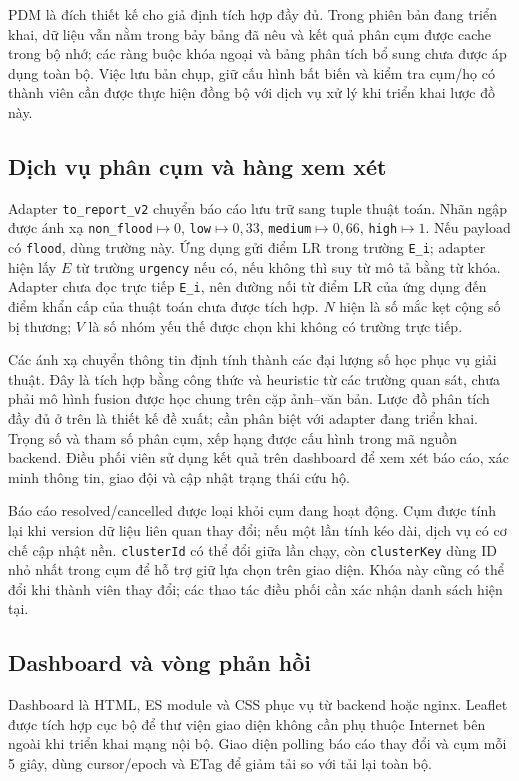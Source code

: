 PDM là đích thiết kế cho giả định tích hợp đầy đủ. Trong phiên bản đang triển khai, dữ liệu vẫn nằm trong bảy bảng đã nêu và kết quả phân cụm được cache trong bộ nhớ; các ràng buộc khóa ngoại và bảng phân tích bổ sung chưa được áp dụng toàn bộ. Việc lưu bản chụp, giữ cấu hình bất biến và kiểm tra cụm/họ có thành viên cần được thực hiện đồng bộ với dịch vụ xử lý khi triển khai lược đồ này.

\subsection{Dịch vụ phân cụm và hàng xem xét}
Adapter \texttt{to\_report\_v2} chuyển báo cáo lưu trữ sang tuple thuật toán. Nhãn ngập được ánh xạ \texttt{non\_flood}$\mapsto0$, \texttt{low}$\mapsto0{,}33$, \texttt{medium}$\mapsto0{,}66$, \texttt{high}$\mapsto1$. Nếu payload có \texttt{flood}, dùng trường này. Ứng dụng gửi điểm LR trong trường \texttt{E\_i}; adapter hiện lấy $E$ từ trường \texttt{urgency} nếu có, nếu không thì suy từ mô tả bằng từ khóa. Adapter chưa đọc trực tiếp \texttt{E\_i}, nên đường nối từ điểm LR của ứng dụng đến điểm khẩn cấp của thuật toán chưa được tích hợp. $N$ hiện là số mắc kẹt cộng số bị thương; $V$ là số nhóm yếu thế được chọn khi không có trường trực tiếp.

Các ánh xạ chuyển thông tin định tính thành các đại lượng số học phục vụ giải thuật. Đây là tích hợp bằng công thức và heuristic từ các trường quan sát, chưa phải mô hình fusion được học chung trên cặp ảnh--văn bản. Lược đồ phân tích đầy đủ ở trên là thiết kế đề xuất; cần phân biệt với adapter đang triển khai. Trọng số và tham số phân cụm, xếp hạng được cấu hình trong mã nguồn backend. Điều phối viên sử dụng kết quả trên dashboard để xem xét báo cáo, xác minh thông tin, giao đội và cập nhật trạng thái cứu hộ.

Báo cáo resolved/cancelled được loại khỏi cụm đang hoạt động. Cụm được tính lại khi version dữ liệu liên quan thay đổi; nếu một lần tính kéo dài, dịch vụ có cơ chế cập nhật nền. \texttt{clusterId} có thể đổi giữa lần chạy, còn \texttt{clusterKey} dùng ID nhỏ nhất trong cụm để hỗ trợ giữ lựa chọn trên giao diện. Khóa này cũng có thể đổi khi thành viên thay đổi; các thao tác điều phối cần xác nhận danh sách hiện tại.

\subsection{Dashboard và vòng phản hồi}
Dashboard là HTML, ES module và CSS phục vụ từ backend hoặc nginx. Leaflet được tích hợp cục bộ để thư viện giao diện không cần phụ thuộc Internet bên ngoài khi triển khai mạng nội bộ. Giao diện polling báo cáo thay đổi và cụm mỗi 5 giây, dùng cursor/epoch và ETag để giảm tải so với tải lại toàn bộ.

